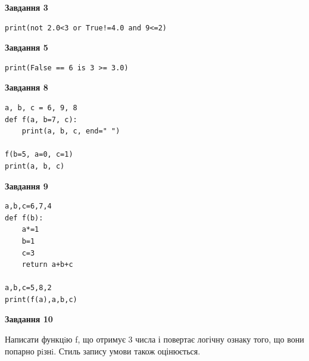 \documentclass[12pt, ukrainian]{article}
\begin{document}
{\begin {large}
\begin{minipage}[t]{7.5cm}
\end{minipage}
\vline \hspace{6mm}
\begin{minipage}[t]{10.5cm}

\begin{center}
\textbf{Завдання 3}
\end{center}

\begin{verbatim}
print(not 2.0<3 or True!=4.0 and 9<=2)
\end{verbatim}



\begin{center}
\textbf{Завдання 5}
\end{center}

\begin{verbatim}
print(False == 6 is 3 >= 3.0)
\end{verbatim}



\begin{center}
\textbf{Завдання 8}
\end{center}

\begin{verbatim}
a, b, c = 6, 9, 8
def f(a, b=7, c):
    print(a, b, c, end=" ")

f(b=5, a=0, c=1)
print(a, b, c)
\end{verbatim}



\begin{center}
\textbf{Завдання 9}
\end{center}

\begin{verbatim}
a,b,c=6,7,4
def f(b):
    a*=1
    b=1
    c=3
    return a+b+c

a,b,c=5,8,2
print(f(a),a,b,c)
\end{verbatim}



\begin{center}
\textbf{Завдання 10}
\end{center}

Написати функцiю f, що отримує 3 числа і повертає логічну ознаку того, що вони попарно рiзнi. Стиль запису умови також оцінюється.\par

\end{minipage}

\end {large}}
\newpage
\end{document}
